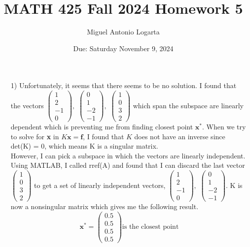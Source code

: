 \documentclass{article}
\title{MATH 425 Fall 2024 Homework 5}
\date{Due: Saturday November 9, 2024}
\author{Miguel Antonio Logarta}
\begin{document}
\maketitle  %
\thispagestyle{fancy}

\begin{enumerate}
    \item[1)] 
    Unfortunately, it seems that there seems to be no solution. I found that the vectors $\begin{pmatrix} 1 \\ 2 \\ -1 \\0 \end{pmatrix},  \,\, \begin{pmatrix} 0 \\ 1 \\ -2 \\ -1 \end{pmatrix}, \,\,  \begin{pmatrix} 1 \\ 0 \\ 3 \\ 2 \end{pmatrix}$ which span the subspace are linearly dependent which is  preventing me from finding closest point $\textbf{x}^*$. When we try to solve for \textbf{x} in $K\textbf{x}=\textbf{f}$, I found that $K$ does not have an inverse since det(K) = 0, which means K is a singular matrix. \\

    However, I can pick a subspace in which the vectors are linearly independent. Using MATLAB, I called rref(A) and found that I can discard the last vector $\begin{pmatrix} 1 \\ 0 \\ 3 \\ 2 \end{pmatrix}$ to get a set of linearly independent vectors, $\begin{pmatrix} 1 \\ 2 \\ -1 \\0 \end{pmatrix},  \,\, \begin{pmatrix} 0 \\ 1 \\ -2 \\ -1 \end{pmatrix}$. K is now a nonsingular matrix which gives me the following result.
    $$\textbf{x}^* = \begin{pmatrix} 0.5 \\ 0.5 \\ 0.5 \\ 0.5 \end{pmatrix} \text{is the closest point}$$


\end{enumerate}
\end{document}
